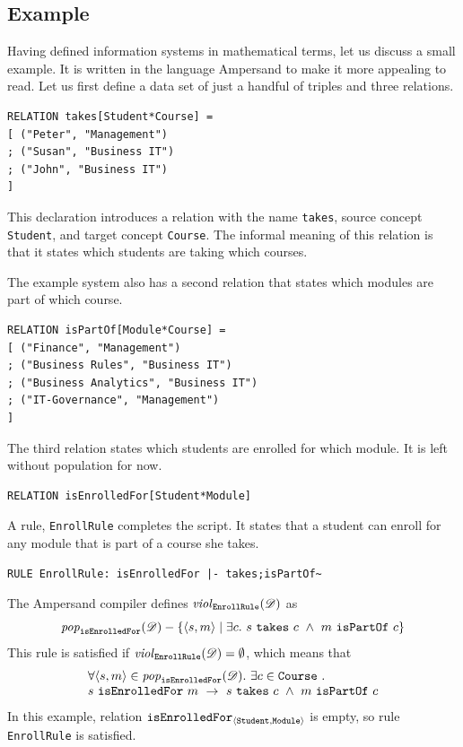 \documentclass[runningheads]{llncs}
\newcommand{\id}[1]{\text{\it #1\/}}
\newcommand{\popF}[1]{\id{pop}_{#1}}
\newcommand{\pop}[2]{\popF{#1}(#2)}
\newcommand{\viol}[2]{\violC{#1}(#2)}
\newcommand{\violC}[1]{\id{viol}_{#1}}
\newcommand{\declare}[3]{\id{#1}_{\pair{#2}{#3}}}
\newcommand{\pair}[2]{\langle{#1},{#2}\rangle}
\newcommand{\dataset}{\mathscr{D}}
\begin{document}
\subsection{Example}
\label{sct:Example existing IS}
   Having defined information systems in mathematical terms, let us discuss a small example.
   It is written in the language Ampersand to make it more appealing to read.
   Let us first define a data set of just a handful of triples and three relations.
\begin{verbatim}
RELATION takes[Student*Course] =
[ ("Peter", "Management")
; ("Susan", "Business IT")
; ("John", "Business IT")
]
\end{verbatim}
   This declaration introduces a relation with the name \verb#takes#,
   source concept \verb#Student#, and
   target concept \verb#Course#.
   The informal meaning of this relation is that it states which students are taking which courses.

   The example system also has a second relation that states which modules are part of which course.
\begin{verbatim}
RELATION isPartOf[Module*Course] =
[ ("Finance", "Management")
; ("Business Rules", "Business IT")
; ("Business Analytics", "Business IT")
; ("IT-Governance", "Management")
]
\end{verbatim}
   The third relation states which students are enrolled for which module.
   It is left without population for now.
\begin{verbatim}
RELATION isEnrolledFor[Student*Module]
\end{verbatim}

   A rule, {\tt EnrollRule} completes the script.
   It states that a student can enroll for any module that is part of a course she takes.
\begin{verbatim}
RULE EnrollRule: isEnrolledFor |- takes;isPartOf~
\end{verbatim}
   The Ampersand compiler defines $\viol{\tt EnrollRule}{\dataset}$ as
\begin{equation}
   \pop{\tt isEnrolledFor}{\dataset}-\{\pair{s}{m} \mid\exists c.~s\ \text{\tt takes}\ c\ \wedge\ m\ \text{\tt isPartOf}\ c\}
\end{equation}
   This rule is satisfied if $\viol{\tt EnrollRule}{\dataset}=\emptyset$, which means that
\begin{equation}
   \begin{array}{l}
   \forall \pair{s}{m}\in\pop{\tt isEnrolledFor}{\dataset}.~ \exists c\in\text{\tt Course}~.\\
   s\ \text{\tt isEnrolledFor}\ m\ \rightarrow\ s\ \text{\tt takes}\ c\ \wedge\ m\ \text{\tt isPartOf}\ c
   \end{array}
\label{eqn:example isEnrolledFor}
\end{equation}
   In this example, relation $\declare{\tt isEnrolledFor}{\tt Student}{\tt Module}$ is empty, so rule {\tt EnrollRule} is satisfied.
\end{document}
